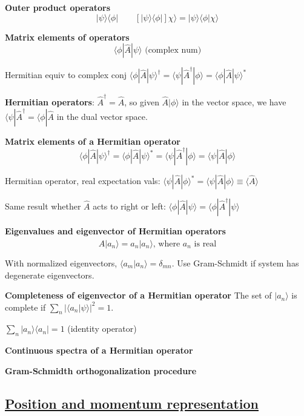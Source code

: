 \textbf{Outer product operators}
$$| \psi \rangle \langle \phi | \qquad [|\psi \rangle \langle \phi |] \chi \rangle  = | \psi \rangle \langle \phi | \chi \rangle$$

\textbf{Matrix elements of operators}
$$\langle \phi | \widehat{A} | \psi \rangle \textrm{ (complex num)}$$

Hermitian equiv to complex conj $\langle \phi | \widehat{A} | \psi \rangle^{\dag} = \langle \psi | \widehat{A}^{\dag} | \phi \rangle = \langle \phi | \widehat{A} | \psi \rangle ^*$

\textbf{Hermitian operators}: $\widehat{A}^{\dag} = \widehat{A}$, so given $\widehat{A} | \phi \rangle$ in the vector space, we have $\langle \psi | \widehat{A}^{\dag} = \langle \phi | \widehat{A}$ in the dual vector space.

\textbf{Matrix elements of a Hermitian operator}
$$\langle \phi | \widehat{A} | \psi \rangle^{\dag} = \langle \phi | \widehat{A} | \psi \rangle^* = \langle \psi | \widehat{A}^{\dag} | \phi \rangle = \langle \psi | \widehat{A} | \phi \rangle$$

Hermitian operator, real expectation vals: $\langle \psi | \widehat{A} | \phi \rangle ^* = \langle \psi | \widehat{A} | \phi \rangle \equiv \langle \widehat{A} \rangle$

Same result whether $\widehat{A}$ acts to right or left: $\langle \phi | \widehat{A} | \psi \rangle = \langle \phi | \widehat{A}^{\dag} | \psi \rangle$

\textbf{Eigenvalues and eigenvector of Hermitian operators}
$$\widehat{A} |a_n \rangle = a_n | a_n \rangle \textrm{, where } a_n \textrm{ is real}$$

With normalized eigenvectors, $\langle a_m | a_n \rangle = \delta_{mn}$. Use Gram-Schmidt if system has degenerate eigenvectors.

\textbf{Completeness of eigenvector of a Hermitian operator}
The set of $|a_n \rangle$ is complete if $\sum_n |\langle a_n | \psi \rangle|^2 = 1$.

$\sum_n |a_n \rangle \langle a_n | = 1$ (identity operator)

\textbf{Continuous spectra of a Hermitian operator}

\textbf{Gram-Schmidth orthogonalization procedure}

\subsection{\underline{Position and momentum representation}}


